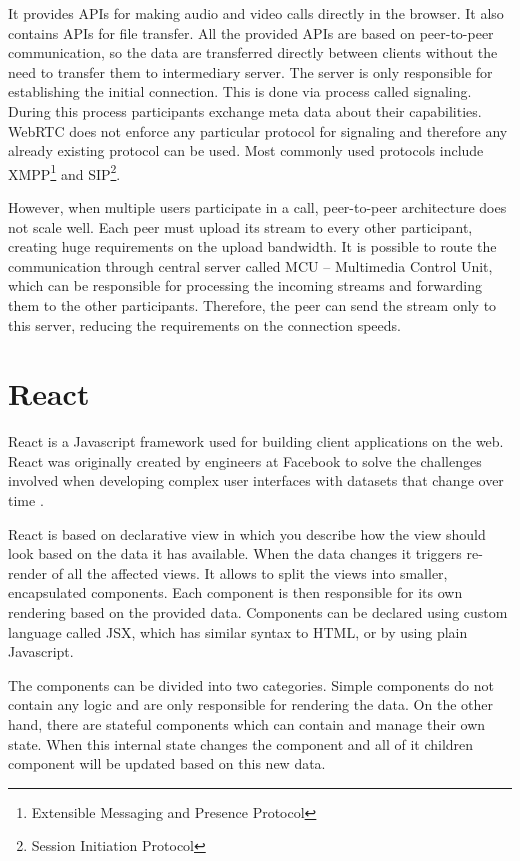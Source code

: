 \documentclass[
  digital, %
  table,   %
  lof,     %
  nolot,     %
]{fithesis3}
\begin{document}
It provides APIs for making audio and video calls directly in the browser. It also contains APIs for file transfer. All the provided APIs are based on peer-to-peer communication, so the data are transferred directly between clients without the need to transfer them to intermediary server. The server is only responsible for establishing the initial connection. This is done via process called signaling. During this process participants exchange meta data about their capabilities. WebRTC does not enforce any particular protocol for signaling and therefore any already existing protocol can be used. Most commonly used protocols include XMPP\footnote{Extensible Messaging and Presence Protocol} and SIP\footnote{Session Initiation Protocol}. 

However, when multiple users participate in a call, peer-to-peer architecture does not scale well. Each peer must upload its stream to every other participant, creating huge requirements on the upload bandwidth. It is possible to route the communication through central server called MCU -- Multimedia Control Unit, which can be responsible for processing the incoming streams and forwarding them to the other participants. Therefore, the peer can send the stream only to this server, reducing the requirements on the connection speeds.

\section{React}
React is a Javascript framework used for building client applications on the web. React was originally created by engineers at Facebook to solve the challenges involved when developing complex user interfaces with datasets that change over time \cite{react}.

React is based on declarative view in which you describe how the view should look based on the data it has available. When the data changes it triggers re-render of all the affected views. It allows to split the views into smaller, encapsulated components. Each component is then responsible for its own rendering based on the provided data. Components can be declared using custom language called JSX, which has similar syntax to HTML, or by using plain Javascript. 

The components can be divided into two categories. Simple components do not contain any logic and are only responsible for rendering the data. On the other hand, there are stateful components which can contain and manage their own state. When this internal state changes the component and all of it children component will be updated based on this new data.
\end{document}

